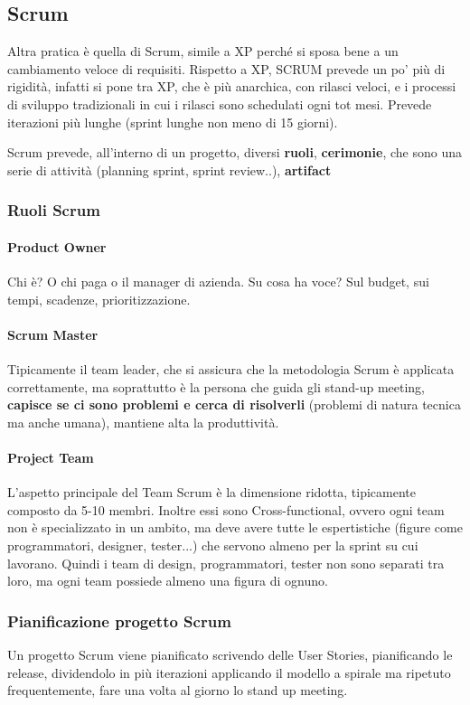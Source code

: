 \documentclass[10pt,a4paper]{book}
\begin{document}
\subsection{Scrum}
Altra pratica è quella di Scrum, simile a XP perché si sposa bene a un cambiamento veloce di requisiti.
Rispetto a XP, SCRUM prevede un po' più di rigidità, infatti si pone tra XP, che è più anarchica, con rilasci veloci, e i processi di sviluppo tradizionali in cui i rilasci sono schedulati ogni tot mesi.
Prevede iterazioni più lunghe (sprint lunghe non meno di 15 giorni).

Scrum prevede, all'interno di un progetto, diversi \textbf{ruoli}, \textbf{cerimonie}, che sono una serie di attività (planning sprint, sprint review..), \textbf{artifact}

\subsubsection{Ruoli Scrum}
\paragraph{Product Owner} Chi è? O chi paga o il manager di azienda. Su cosa ha voce? Sul budget, sui tempi, scadenze, prioritizzazione.

\paragraph{Scrum Master} Tipicamente il team leader, che si assicura che la metodologia Scrum è applicata correttamente, ma soprattutto è la persona che guida gli stand-up meeting, \textbf{capisce se ci sono problemi e cerca di risolverli} (problemi di natura tecnica ma anche umana), mantiene alta la produttività.

\paragraph{Project Team} L'aspetto principale del Team Scrum è la dimensione ridotta, tipicamente composto da 5-10 membri. Inoltre essi sono Cross-functional, ovvero ogni team non è specializzato in un ambito, ma deve avere tutte le espertistiche (figure come programmatori, designer, tester...) che servono almeno per la sprint su cui lavorano. Quindi i team di design, programmatori, tester non sono separati tra loro, ma ogni team possiede almeno una figura di ognuno.

\subsubsection{Pianificazione progetto Scrum}
Un progetto Scrum viene pianificato scrivendo delle User Stories, pianificando le release, dividendolo in più iterazioni applicando il modello a spirale ma ripetuto frequentemente, fare una volta al giorno lo stand up meeting.
\end{document}
